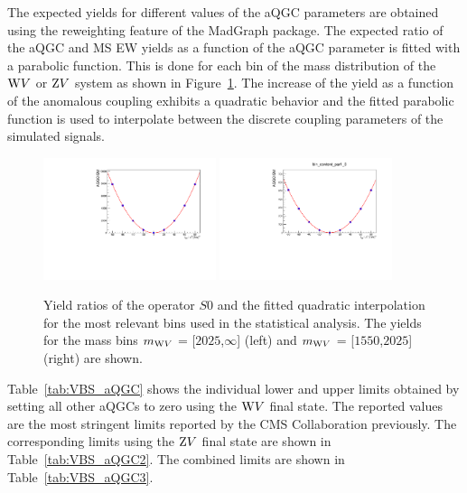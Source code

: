 The expected yields for different values of the aQGC parameters are obtained using the reweighting feature of the MadGraph package. The expected ratio of the aQGC and MS EW yields as a function of the aQGC parameter is fitted with a parabolic function. This is done for each bin of the mass distribution of the $\mathrm{W} V$ or $\mathrm{Z} V$ system as shown in Figure~\ref{fig:aqgc_pol}. The increase of the yield as a function of the anomalous coupling exhibits a quadratic behavior and the fitted parabolic function is used to interpolate between the discrete coupling parameters of the simulated signals.      

\begin{figure}[!htbp]
\centering
\includegraphics[width=0.45\textwidth]{Plots/plots/aqgc_pol2.pdf}
\includegraphics[width=0.45\textwidth]{Plots/plots/aqgc_pol2_bin.pdf}
\caption{Yield ratios of the operator $S0$ and the fitted quadratic interpolation for the most relevant bins used in the statistical analysis. The yields for the mass bins $m_{\mathrm{W} V}$ = [$2025$,$\infty$] (left) and  $m_{\mathrm{W} V}$ = [$1550$,$2025$] (right) are shown.}
\label{fig:aqgc_pol}
\end{figure}

Table~\ref{tab:VBS_aQGC} shows the individual lower and upper limits obtained by setting all other aQGCs to zero using the $\mathrm{W} V$ final state. The reported values are the most stringent limits reported by the CMS Collaboration previously. The corresponding limits using the $\mathrm{Z} V$ final state are shown in Table~\ref{tab:VBS_aQGC2}. The combined limits are shown in Table~\ref{tab:VBS_aQGC3}.

